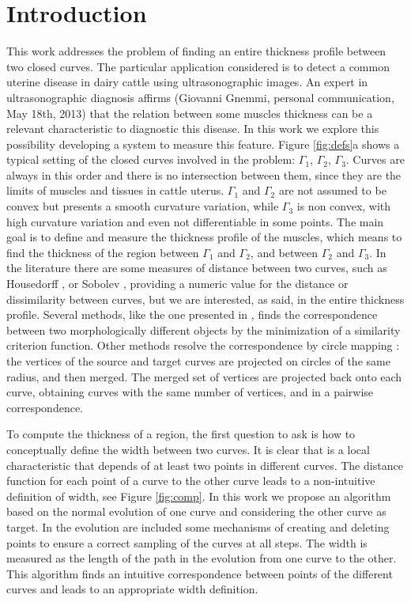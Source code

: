 \documentclass{article}
\begin{document}
\section{Introduction}
\label{sec:intro}
This work addresses the problem of finding an entire thickness profile between two closed curves. The particular application considered is to detect a common uterine disease in dairy cattle using ultrasonographic images. An expert in ultrasonographic diagnosis affirms (Giovanni Gnemmi, personal communication, May 18th, 2013) that the relation between some muscles thickness can be a relevant characteristic to diagnostic this disease. In this work we explore this possibility developing a system to measure this feature. Figure \ref{fig:defs}a shows a typical setting of the closed curves involved in the problem: $\Gamma_1$, $\Gamma_2$, $\Gamma_3$. Curves are always in this order and there is no intersection between them, since they are the limits of muscles and tissues in cattle uterus. $\Gamma_1$ and $\Gamma_2$ are not assumed to be convex but presents a smooth curvature variation, while $\Gamma_3$ is non convex, with high curvature variation and even not differentiable in some points. The main goal is to define and measure the thickness profile of the muscles, which means to find the thickness of the region between $\Gamma_1$ and $\Gamma_2$, and between $\Gamma_2$ and $\Gamma_3$. In the literature there are some measures of distance between two curves, such as Housedorff \cite{libroMorel}, or Sobolev \cite{statistics}, providing a numeric value for the distance or dissimilarity between curves, but we are interested, as said, in the entire thickness profile. Several methods, like the one presented in \cite{paperWarping}, finds the correspondence between two morphologically different objects by the minimization of a similarity criterion function. Other methods resolve the correspondence by circle mapping \cite{libro}: the vertices of the source and target curves are projected on circles of the same radius, and then merged. The merged set of vertices are projected back onto each curve, obtaining curves with the same number of vertices, and in a pairwise correspondence.

To compute the thickness of a region, the first question to ask is how to conceptually define the width between two curves. It is clear that is a local characteristic that depends of at least two points in different curves. The distance function for each point of a curve to the other curve leads to a non-intuitive definition of width, see Figure \ref{fig:comp}. In this work we propose an algorithm based on the normal evolution of one curve and considering the other curve as target. In the evolution are included some mechanisms of creating and deleting points to ensure a correct sampling of the curves at all steps. The width is measured as the length of the path in the evolution from one curve to the other. This algorithm finds an intuitive correspondence between points of the different curves and leads to an appropriate width definition.
\end{document}
